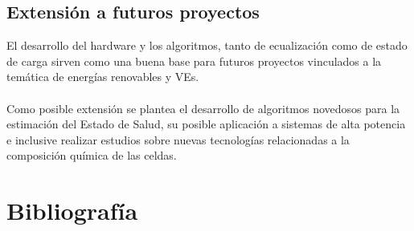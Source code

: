 \documentclass[10pt,a4paper]{article}
\begin{document}
\subsection{Extensión a futuros proyectos}

El desarrollo del hardware y los algoritmos, tanto de ecualización como de estado de carga sirven como una buena base para futuros proyectos vinculados a la temática de energías renovables y VEs.\\
\\
Como posible extensión se plantea el desarrollo de algoritmos novedosos para la estimación del Estado de Salud, su posible aplicación a sistemas de alta potencia e inclusive realizar estudios sobre nuevas tecnologías relacionadas a la composición química de las celdas.

\clearpage

\section{Bibliografía}

 

\end{document}
